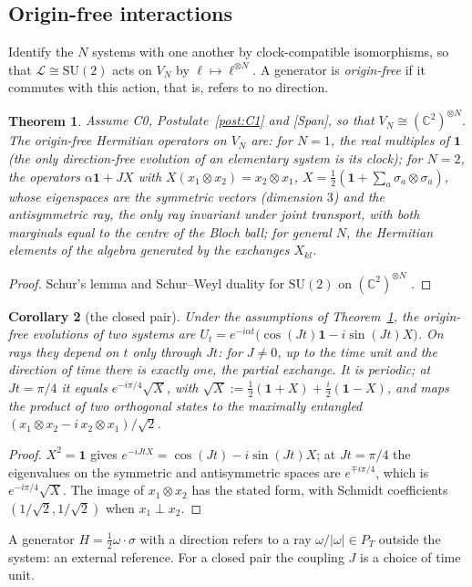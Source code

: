 \documentclass[aps,pra,onecolumn,superscriptaddress,nofootinbib,10pt]{revtex4-2}
\newtheorem{theorem}{Theorem}
\newtheorem{corollary}[theorem]{Corollary}
\theoremstyle{definition}
\theoremstyle{remark}
\newcommand{\C}{\mathbb{C}}
\newcommand{\cL}{\mathcal{L}}
\newcommand{\SU}{\mathrm{SU}}
\begin{document}
\subsection{Origin-free interactions}
Identify the $N$ systems with one another by clock-compatible isomorphisms, so that $\cL\cong\SU(2)$
acts on $V_N$ by $\ell\mapsto\ell^{\otimes N}$.  A generator is \emph{origin-free} if it commutes with
this action, that is, refers to no direction.

\begin{theorem}\label{thm:originfree}
Assume C0, Postulate~\ref{post:C1} and [Span], so that $V_N\cong(\C^2)^{\otimes N}$.  The origin-free
Hermitian operators on $V_N$ are: for $N=1$, the real multiples of $\mathbf1$ (the only
direction-free evolution of an elementary system is its clock); for $N=2$, the operators
$\alpha\mathbf1+JX$ with $X(x_1\otimes x_2)=x_2\otimes x_1$, $X=\tfrac12(\mathbf1+\sum_a\sigma_a\otimes\sigma_a)$,
whose eigenspaces are the symmetric vectors (dimension $3$) and the antisymmetric ray, the only ray
invariant under joint transport, with both marginals equal to the centre of the Bloch ball; for
general $N$, the Hermitian elements of the algebra generated by the exchanges $X_{kl}$.
\end{theorem}
\begin{proof}
Schur's lemma and Schur--Weyl duality for $\SU(2)$ on $(\C^2)^{\otimes N}$ \cite{GW}.
\end{proof}

\begin{corollary}[the closed pair]\label{cor:pair}
Under the assumptions of Theorem~\ref{thm:originfree}, the origin-free evolutions of two systems are $U_t=e^{-i\alpha t}\bigl(\cos(Jt)\mathbf1-i\sin(Jt)X\bigr)$.
On rays they depend on $t$ only through $Jt$: for $J\ne0$, up to the time unit and the direction of
time there is exactly one, the partial exchange.  It is periodic; at $Jt=\pi/4$ it equals
$e^{-i\pi/4}\sqrt{X}$, with $\sqrt X:=\tfrac12(\mathbf1+X)+\tfrac i2(\mathbf1-X)$, and maps the product
of two orthogonal states to the maximally entangled $(x_1\otimes x_2-i\,x_2\otimes x_1)/\sqrt2$.
\end{corollary}
\begin{proof}
$X^2=\mathbf1$ gives $e^{-iJtX}=\cos(Jt)-i\sin(Jt)X$; at $Jt=\pi/4$ the eigenvalues on the symmetric and
antisymmetric spaces are $e^{\mp i\pi/4}$, which is $e^{-i\pi/4}\sqrt X$.  The image of $x_1\otimes x_2$
has the stated form, with Schmidt coefficients $(1/\sqrt2,1/\sqrt2)$ when $x_1\perp x_2$.
\end{proof}
A generator $H=\tfrac12\omega\cdot\sigma$ with a direction refers to a ray
$\omega/\lvert\omega\rvert\in P_T$ outside the system: an external reference.  For a closed pair the
coupling $J$ is a choice of time unit.
\end{document}
